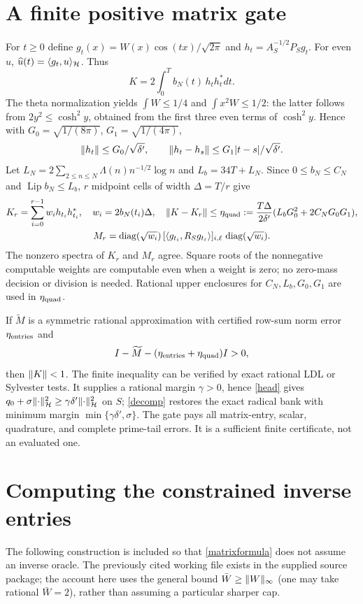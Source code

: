 \documentclass[11pt]{article}
\begin{document}
\section{A finite positive matrix gate}\label{matrix}
For $t\ge0$ define $g_t(x)=W(x)\cos(tx)/\sqrt{2\pi}$ and $h_t=A_S^{-1/2}P_Sg_t$. For even $u$, $\widehat u(t)=\langle g_t,u\rangle_{\mathcal H}$. Thus
\begin{equation}\label{feature}
 K=2\int_0^T b_N(t)\,h_t h_t^*dt.
\end{equation}
The theta normalization yields $\int W\le1/4$ and $\int x^2W\le1/2$: the latter follows from $2y^2\le\cosh^2y$, obtained from the first three even terms of $\cosh^2y$. Hence with $G_0=\sqrt{1/(8\pi)}$, $G_1=\sqrt{1/(4\pi)}$,
\[\lVert h_t\rVert\le G_0/\sqrt{\delta'},\qquad \lVert h_t-h_s\rVert\le G_1|t-s|/\sqrt{\delta'}.
\]
Let $L_N=2\sum_{2\le n\le N}\Lambda(n)n^{-1/2}\log n$ and $L_b=34T+L_N$. Since $0\le b_N\le C_N$ and $\operatorname{Lip}b_N\le L_b$, $r$ midpoint cells of width $\Delta=T/r$ give
\begin{gather}\label{quad}
 K_r=\sum_{i=0}^{r-1}w_i h_{t_i}h_{t_i}^*,\quad w_i=2b_N(t_i)\Delta,\quad
 \lVert K-K_r\rVert\le\eta_{\rm quad}:=\frac{T\Delta}{2\delta'}(L_bG_0^2+2C_NG_0G_1),\\
 M_r=\operatorname{diag}(\sqrt{w_i})\,[\langle g_{t_i},R_Sg_{t_\ell}\rangle]_{i,\ell}\,\operatorname{diag}(\sqrt{w_i}).\label{matrixformula}
\end{gather}
The nonzero spectra of $K_r$ and $M_r$ agree. Square roots of the nonnegative computable weights are computable even when a weight is zero; no zero-mass decision or division is needed. Rational upper enclosures for $C_N,L_b,G_0,G_1$ are used in $\eta_{\rm quad}$.

If $\widetilde M$ is a symmetric rational approximation with certified row-sum norm error $\eta_{\rm entries}$ and
\begin{equation}\label{gate}
 I-\widetilde M-(\eta_{\rm entries}+\eta_{\rm quad})I>0,
\end{equation}
then $\lVert K\rVert<1$. The finite inequality can be verified by exact rational LDL or Sylvester tests. It supplies a rational margin $\gamma>0$, hence \eqref{head} gives $q_0+\sigma\lVert\cdot\rVert_{\mathcal H}^2\ge\gamma\delta'\lVert\cdot\rVert_{\mathcal H}^2$ on $S$; \eqref{decomp} restores the exact radical bank with minimum margin $\min\{\gamma\delta',\sigma\}$. The gate pays all matrix-entry, scalar, quadrature, and complete prime-tail errors. It is a sufficient finite certificate, not an evaluated one.

\section{Computing the constrained inverse entries}\label{inverse}
The following construction is included so that \eqref{matrixformula} does not assume an inverse oracle. The previously cited working file \cite{inversefile} exists in the supplied source package; the account here uses the general bound $\bar W\ge\lVert W\rVert_\infty$ (one may take rational $\bar W=2$), rather than assuming a particular sharper cap.
\end{document}
